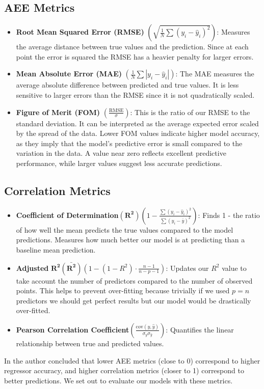 \documentclass{ucdgradtaughtthesis}
\begin{document}
\subsection{AEE Metrics}
\begin{itemize}
    \item \textbf{Root Mean Squared Error (RMSE)} \( \left(\sqrt{\frac{1}{N} \sum (y_i - \hat{y}_i)^2} \right)\): Measures the average distance between true values and the prediction. Since at each point the error is squared the RMSE has a heavier penalty for larger errors.
    \item \textbf{Mean Absolute Error (MAE)} \( \left( \frac{1}{N} \sum |y_i - \hat{y}_i|\right) \):  The MAE measures the average absolute difference between predicted and true values. It is less sensitive to larger errors than the RMSE since it is not quadratically scaled.
    \item \textbf{Figure of Merit (FOM)} \( \left( \frac{\text{RMSE}}{\sigma}\right) \): This is the ratio of our RMSE to the standard deviation. It can be interpreted as the average expected error scaled by the spread of the data. 
    Lower FOM values indicate higher model accuracy, as they imply that the model's predictive error is small compared to the variation in the data. A value near zero reflects excellent predictive performance, while larger values suggest less accurate predictions.
\end{itemize}

\subsection{Correlation Metrics}
\begin{itemize}
    \item \textbf{Coefficient of Determination}\(\left(\mathbf{R^2}\right)\)\( \left(1 - \frac{\sum (y_i - \hat{y}_i)^2}{\sum (y_i - \bar{y})^2}\right) \): Finds 1 - the ratio of how well the mean predicts the true values compared to the model predictions. Measures how much better our model is at predicting than a baseline mean prediction.
    
    \item \textbf{Adjusted} \(\mathbf{R^2 \left( \bar{R^2}\right)}\)\( \left( 1 - (1 - R^2) \cdot \frac{n - 1}{n - p - 1} \right) \): Updates our \( R^2 \) value to take account the number of predictors compared to the number of observed points. This helps to prevent over-fitting because trivially if we used \(p=n\) predictors we should get perfect results but our model would be drastically over-fitted.
    
    \item \textbf{Pearson Correlation Coefficient}\( \left(\frac{\text{cov}(y, \hat{y})}{\sigma_y \sigma_{\hat{y}}} \right) \):  Quantifies the linear relationship between true and predicted values.
\end{itemize}
In \cite{metrics} the author concluded that lower AEE metrics (close to 0) correspond to higher regressor accuracy, and higher correlation metrics (closer to 1) correspond to better predictions. We set out to evaluate our models with these metrics.
\end{document}
